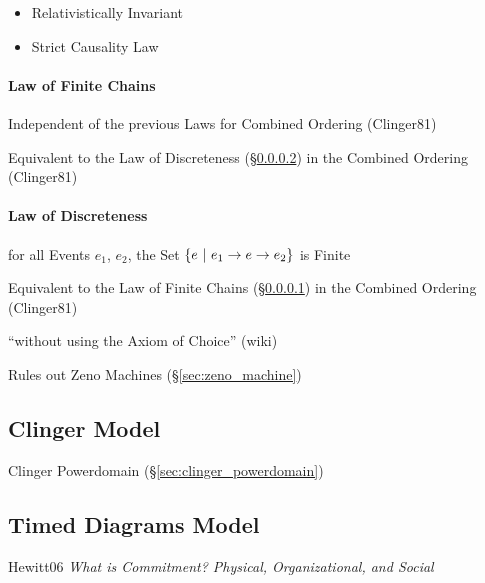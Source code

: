 \begin{itemize}
  \item Relativistically Invariant
  \item Strict Causality Law
\end{itemize}



\paragraph{Law of Finite Chains}\label{sec:finite_chain_law}\hfill

Independent of the previous Laws for Combined Ordering (Clinger81)

Equivalent to the Law of Discreteness (\S\ref{sec:discreteness_law})
in the Combined Ordering (Clinger81)


\paragraph{Law of Discreteness}\label{sec:discreteness_law}\hfill

for all Events $e_1$, $e_2$, the Set $\{ e \ |\ e_1 \rightarrow e \rightarrow
e_2 \}$ is Finite

Equivalent to the Law of Finite Chains (\S\ref{sec:finite_chain_law})
in the Combined Ordering (Clinger81)

``without using the Axiom of Choice'' (wiki) %

\fist Rules out Zeno Machines (\S\ref{sec:zeno_machine})



\subsection{Clinger Model}\label{sec:clinger_model}

Clinger Powerdomain (\S\ref{sec:clinger_powerdomain})



\subsection{Timed Diagrams Model}\label{sec:timed_diagrams}

Hewitt06 \emph{What is Commitment? Physical, Organizational, and
  Social}

